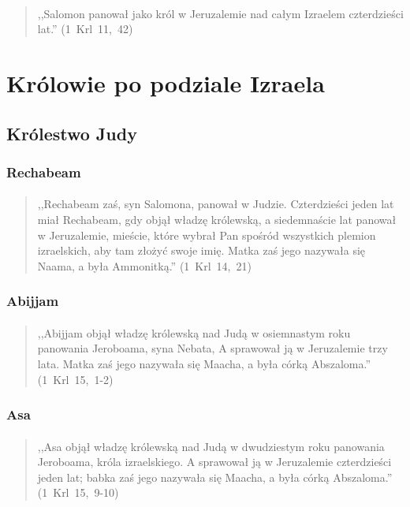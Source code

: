 \documentclass[10pt,a4paper,oneside]{article}
\begin{document}
\paragraph{}
\begin{quote}
,,Salomon panował jako król w Jeruzalemie nad całym Izraelem czterdzieści lat.'' \mbox{(1 Krl 11, 42)}
\end{quote}
\section{Królowie po podziale Izraela}
\subsection{Królestwo Judy}
\subsubsection{Rechabeam}
\paragraph{}
\begin{quote}
,,Rechabeam zaś, syn Salomona, panował w Judzie. Czterdzieści jeden lat miał Rechabeam, gdy objął władzę królewską, a siedemnaście lat panował w Jeruzalemie, mieście, które wybrał Pan spośród wszystkich plemion izraelskich, aby tam złożyć swoje imię. Matka zaś jego nazywała się Naama, a była Ammonitką.'' \mbox{(1 Krl 14, 21)}
\end{quote}
\subsubsection{Abijjam}
\paragraph{}
\begin{quote}
,,Abijjam objął władzę królewską nad Judą w osiemnastym roku panowania Jeroboama, syna Nebata, A sprawował ją w Jeruzalemie trzy lata. Matka zaś jego nazywała się Maacha, a była córką Abszaloma.'' \mbox{(1 Krl 15, 1-2)}
\end{quote}
\subsubsection{Asa}
\paragraph{}
\begin{quote}
,,Asa objął władzę królewską nad Judą w dwudziestym roku panowania Jeroboama, króla izraelskiego. A sprawował ją w Jeruzalemie czterdzieści jeden lat; babka zaś jego nazywała się Maacha, a była córką Abszaloma.'' \mbox{(1 Krl 15, 9-10)}
\end{quote}
\end{document}
